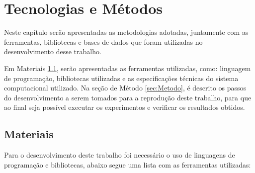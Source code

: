 \chapter{Tecnologias e Métodos}
Neste capítulo serão apresentadas as metodologias adotadas, juntamente com as ferramentas, bibliotecas e bases de dados que foram utilizadas no desenvolvimento desse trabalho.

Em Materiais \ref{sec:Materiais}, serão apresentadas as ferramentas utilizadas, como: linguagem de programação, bibliotecas utilizadas e as especificações técnicas do sistema computacional utilizado. Na seção de Método \ref{sec:Metodo}, é descrito os passos do desenvolvimento a serem tomados para a reprodução deste trabalho, para que ao final seja possível executar os experimentos e verificar os resultados obtidos.


\section[Materiais]{Materiais}\label{sec:Materiais}

Para o desenvolvimento deste trabalho foi necessário o uso  de linguagens de programação e bibliotecas, abaixo segue uma lista com as ferramentas  utilizadas:

